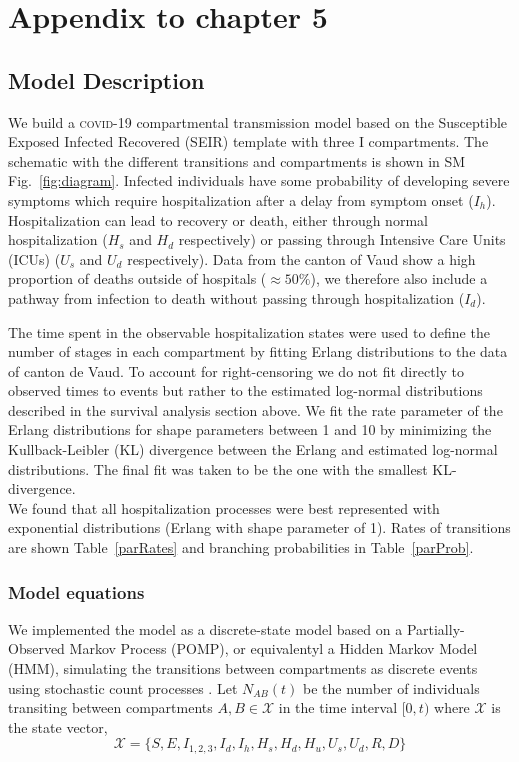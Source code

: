 \chapter{Appendix to chapter 5}

\section{Model Description}
We build a \textsc{covid}-19 compartmental transmission model based on the Susceptible Exposed Infected Recovered (SEIR) template with three I compartments. The schematic with the different transitions and compartments is shown in SM Fig.~\ref{fig:diagram}. Infected individuals have some probability of developing severe symptoms which require hospitalization after a delay from symptom onset ($I_h$). Hospitalization can lead to recovery or death, either through normal hospitalization ($H_{s}$ and $H_d$ respectively) or passing through Intensive Care Units (ICUs) ($U_{s}$ and $U_d$ respectively). Data from the canton of Vaud show a high proportion of deaths outside of hospitals ($\approx 50\%$), we therefore also include a pathway from infection to death without passing through hospitalization ($I_d$). 


The time spent in the observable hospitalization states were used to define the number of stages in each compartment by fitting Erlang distributions to the data of canton de Vaud. To account for right-censoring we do not fit directly to observed times to events but rather to the estimated log-normal distributions described in the survival analysis section above. We fit the rate parameter of the Erlang distributions for shape parameters between 1 and 10 by minimizing the Kullback-Leibler (KL) divergence between the Erlang and estimated log-normal distributions. The final fit was taken to be the one with the smallest KL-divergence. \\


We found that all hospitalization processes were best represented with exponential distributions (Erlang with shape parameter of 1). Rates of transitions are shown Table~\ref{parRates} and branching probabilities in Table~\ref{parProb}.

\subsection{Model equations}\label{sec:stoch}
We implemented the model as a discrete-state model based on a Partially-Observed Markov Process (POMP), or equivalentyl a Hidden Markov Model (HMM), simulating the transitions between compartments as discrete events using stochastic count processes \cite{king_inapparent_2008, breto_time_2009}. Let \(N_{AB}(t)\) be the number of individuals transiting between compartments \(A,B\in \mathcal{X}\) in the time interval \([0,t)\)  where $\mathcal{X}$ is the state vector,
$$\mathcal{X} = \{S, E, I_{1,2,3} , I_d, I_h, H_{s}, H_{d}, H_{u}, U_{s}, U_{d}, R, D\}$$

